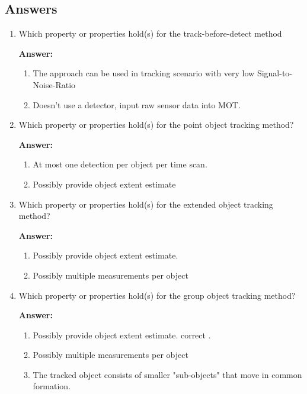 \subsection{Answers}

\begin{enumerate}
\item Which property or properties hold(s) for the track-before-detect method

\textbf{Answer:}

\begin{enumerate}
\item The approach can be used in tracking scenario with very low Signal-to-Noise-Ratio
\item Doesn't use a detector, input raw sensor data into MOT. 
\end{enumerate}
\item Which property or properties hold(s) for the point object tracking method?

\textbf{Answer:}

\begin{enumerate}
\item At most one detection per object per time scan.
\item Possibly provide object extent estimate
\end{enumerate}

\item Which property or properties hold(s) for the extended object tracking method?

\textbf{Answer:}

\begin{enumerate}
\item Possibly provide object extent estimate.
\item Possibly multiple measurements per object
\end{enumerate}

\item Which property or properties hold(s) for the group object tracking method?

\textbf{Answer:}

\begin{enumerate}
\item Possibly provide object extent estimate. correct .
\item Possibly multiple measurements per object
\item The tracked object consists of smaller "sub-objects" that move in common formation.
\end{enumerate}


\end{enumerate}
